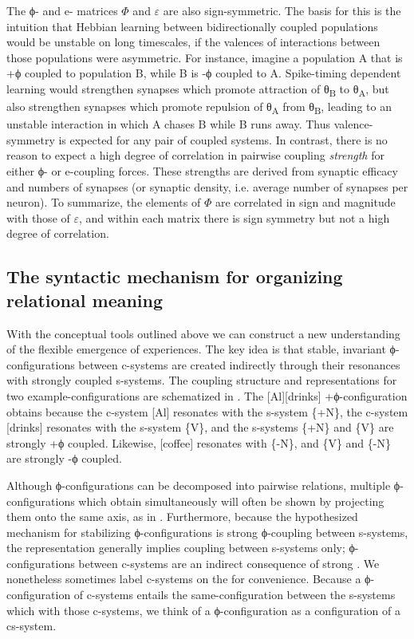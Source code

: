   The ϕ- and e- matrices $\Phi$ and $\varepsilon $ are also sign-symmetric. The basis for this is the intuition that Hebbian learning between bidirectionally coupled populations would be unstable on long timescales, if the valences of interactions between those populations were asymmetric. For instance, imagine a population A that is +ϕ coupled to population B, while B is -ϕ coupled to A. Spike-timing dependent learning would strengthen synapses which promote attraction of θ\textsubscript{B} to θ\textsubscript{A}, but also strengthen synapses which promote repulsion of θ\textsubscript{A} from θ\textsubscript{B}, leading to an unstable interaction in which A chases B while B runs away. Thus valence-symmetry is expected for any pair of coupled systems. In contrast, there is no reason to expect a high degree of correlation in pairwise coupling \textit{strength} for either ϕ- or e-coupling forces. These strengths are derived from synaptic efficacy and numbers of synapses (or synaptic density, i.e. average number of synapses per neuron). To summarize, the elements of $\Phi$ are correlated in sign and magnitude with those of $\varepsilon $, and within each matrix there is sign symmetry but not a high degree of correlation.

\subsection{The syntactic mechanism for organizing relational meaning}

With the conceptual tools outlined above we can construct a new understanding of the flexible emergence of  experiences. The key idea is that stable, invariant ϕ-configurations between c-systems are created indirectly through their resonances with strongly coupled s-systems. The coupling structure and  representations for two example-configurations are schematized in {}. The [Al][drinks] +ϕ-configuration obtains because the c-system [Al] resonates with the s-system \{+N\}, the c-system [drinks] resonates with the s-system \{V\}, and the s-systems \{+N\} and \{V\} are strongly +ϕ coupled. Likewise, [coffee] resonates with \{-N\}, and \{V\} and \{-N\} are strongly -ϕ coupled.

  Although ϕ-configurations can be decomposed into pairwise relations, multiple ϕ-configurations which obtain simultaneously will often be shown by projecting them onto the same  axis, as in {}. Furthermore, because the hypothesized mechanism for stabilizing ϕ-configurations is strong ϕ-coupling between s-systems, the  representation generally implies coupling between s-systems only; ϕ-configurations between c-systems are an indirect consequence of strong . We nonetheless sometimes label c-systems on the  for convenience. Because a ϕ-configuration of c-systems entails the same-configuration between the s-systems which  with those c-systems, we think of a ϕ-configuration as a configuration of a cs-system. 

